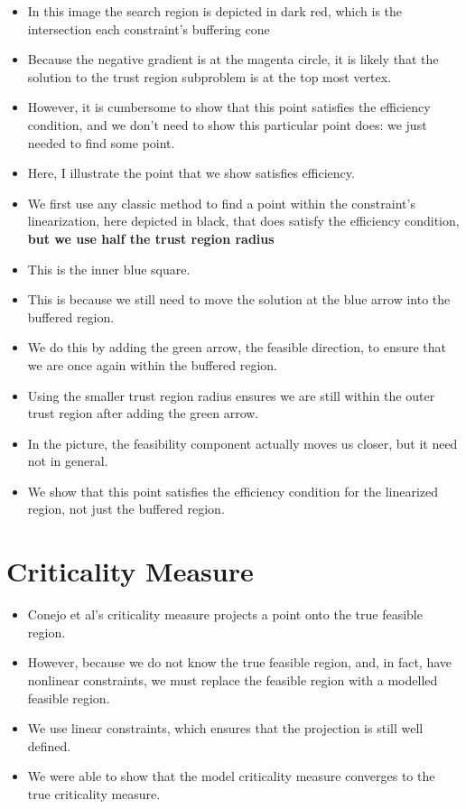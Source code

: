 \documentclass{article}
\begin{document}
\begin{itemize}
\item In this image the search region is depicted in dark red, which is the intersection each constraint's buffering cone
\item Because the negative gradient is at the magenta circle, it is likely that the solution to the trust region subproblem is at the top most vertex.
\item However, it is cumbersome to show that this point satisfies the efficiency condition, and we don't need to show this particular point does: we just needed to find some point.
\item Here, I illustrate the point that we show satisfies efficiency.
\item We first use any classic method to find a point within the constraint's linearization, here depicted in black, that does satisfy the efficiency condition, \textbf{but we use half the trust region radius}
\item This is the inner blue square.
\item This is because we still need to move the solution at the blue arrow into the buffered region.
\item We do this by adding the green arrow, the feasible direction, to ensure that we are once again within the buffered region.
\item Using the smaller trust region radius ensures we are still within the outer trust region after adding the green arrow.
\item In the picture, the feasibility component actually moves us closer, but it need not in general.
\item We show that this point satisfies the efficiency condition for the linearized region, not just the buffered region.
\end{itemize}


	\section{Criticality Measure}
\begin{itemize}
\item Conejo et al's criticality measure projects a point onto the true feasible region.
\item However, because we do not know the true feasible region, and, in fact, have nonlinear constraints, we must replace the feasible region with a modelled feasible region.
\item We use linear constraints, which ensures that the projection is still well defined.
\item We were able to show that the model criticality measure converges to the true criticality measure.
\end{itemize}
\end{document}

